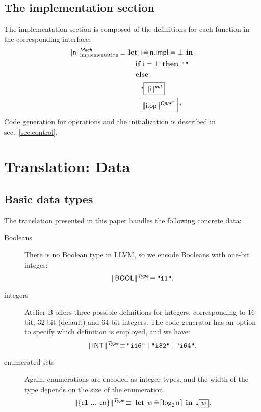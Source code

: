 \documentclass{llncs}
\newcommand{\trad}[2]{\ensuremath{\lVert \textsf{#1} \rVert^{\textit{#2}}}}
\DeclareMathOperator{\isdef}{\equiv}
\newcommand{\llvm}[1]{\texttt{#1}}
\newcommand{\B}[1]{\textsf{#1}}
\newcommand{\ListOf}[1]{$\mbox{#1}^+$}
\newcommand{\IF}[0]{\textbf{ if }}
\newcommand{\ELSE}[0]{\textbf{ else }}
\newcommand{\THEN}[0]{\textbf{ then }}
\newcommand{\LET}[0]{\textbf{ let }}
\DeclareMathOperator{\BE}{\hat{=}}
\newcommand{\IN}[0]{\textbf{ in }}
\newcommand{\PH}[1]{\framebox{$#1$}}
\begin{document}
\subsection{The implementation section}

The implementation section is composed of the definitions for each function
in the corresponding interface:
\begin{align*}
  \trad{\B{n}}{\B{Mach}}_{\text{implementation}} \isdef
  & \LET \B{i} \BE \B{n.impl} = \bot \IN\\
  & \quad \IF \B{i} = \bot \THEN \llvm{""} \\
  & \quad \ELSE \\
  & \quad \quad \llvm{"\PH{\trad{\B{i}}{\B{init}}}} \\
  & \quad \quad \llvm{\PH{\trad{\B{i.op}}{\ListOf{\B{Oper}}}}"}
\end{align*}
Code generation for operations and the initialization is described in
sec.~\ref{sec:control}.

\section{Translation: Data}
\label{sec:data}

\subsection{Basic data types}

The translation presented in this paper handles the following concrete data:
\begin{description}
\item[Booleans] There is no Boolean type in LLVM, so we encode Booleans with
  one-bit integer:
$$\trad{BOOL}{\B{Type}} \isdef \llvm{"i1"}.$$
\item[integers] Atelier-B offers three possible definitions for integers,
  corresponding to 16-bit, 32-bit (default) and 64-bit integers. The code
  generator has an option to specify which definition is employed, and we have:
$$\trad{INT}{\B{Type}} \isdef \llvm{"i16"} \mid \llvm{"i32"} \mid \llvm{"i64"}.$$
\item[enumerated sets] Again, enumerations are encoded as integer types, and the
  width of the type depends on the size of the enumeration.
$$\trad{\{e1 ... en\}}{\B{Type}} \isdef \LET w \BE \lceil \log_2 \B{n} \rceil \IN \llvm{i\PH{w}}.$$

\end{description}
\end{document}
